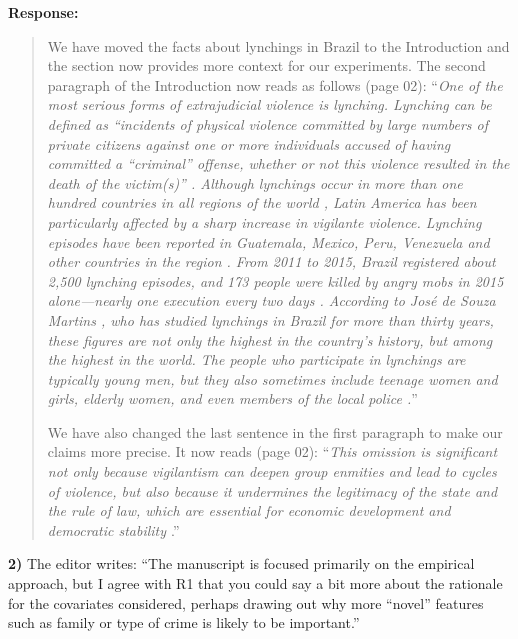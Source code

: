 \documentclass[a4paper,12pt]{article}
\begin{document}
\noindent \textbf{Response:} 
\begin{quote}

We have moved the facts about lynchings in Brazil to the Introduction and 
the section now provides more context for our experiments. The
second paragraph of the Introduction now reads as follows (page 02):
``\textit{One of the most serious forms of extrajudicial violence is lynching.
  Lynching can be defined as ``incidents of physical violence committed by
  large numbers of private citizens against one or more individuals accused of
  having committed a ``criminal'' offense, whether or not this violence
  resulted in the death of the victim(s)'' \citep[645]{godoy2004justice}.
  Although lynchings occur in more than one hundred countries in all regions of
  the world \citep{jung2020lynching,smith2019contradictions}, Latin America has
  been particularly affected by a sharp increase in vigilante violence.
  Lynching episodes have been reported in Guatemala, Mexico, Peru, Venezuela
  and other countries in the region \citep{barbara2015vigilantes,
  cruz2019determinants, godoy2004justice}. From 2011 to 2015, Brazil registered
  about 2,500 lynching episodes, and 173 people were killed by angry mobs in
  2015 alone---nearly one execution every two days
  \citep{barbara2015vigilantes, oliveira2016mob}. According to José de Souza
  Martins \citeyearpar{martins2015linchamentos}, who has studied lynchings in
  Brazil for more than thirty years, these figures are not only the highest in
  the country's history, but among the highest in the world. The people who
participate in lynchings are typically young men, but they also sometimes
include teenage women and girls, elderly women, and even members of the local
police \citep{moura2017linchamentos}.}''

We have also changed the last sentence in the first paragraph to make our
claims more precise. It now reads (page 02): ``\textit{This
omission is significant not only because vigilantism can deepen group enmities
and lead to cycles of violence, but also because it undermines the legitimacy
of the state and the rule of law, which are essential for economic development
and democratic stability \citep{jung2020lynching, tankebe2009self}}.''

\end{quote}

\vspace{.3cm}

\noindent \textbf{2)} The editor writes: ``The manuscript is focused primarily
on the empirical approach, but I agree with R1 that you could say a bit more
about the rationale for the covariates considered, perhaps drawing out why more
``novel'' features such as family or type of crime is likely to be important.'' 
\end{document}

